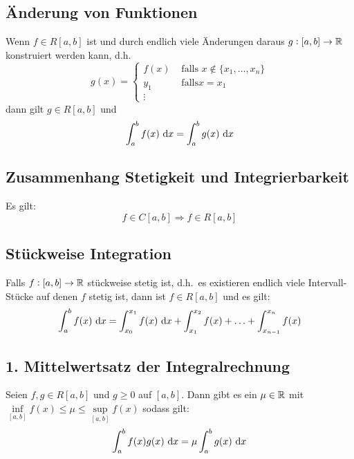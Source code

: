 \subsection{Änderung von Funktionen}
Wenn $f \in R[a, b]$ ist und durch endlich viele Änderungen daraus
$g: [a,b] \rightarrow \mathbb{R}$ konstruiert werden kann, d.h.
\begin{equation*}
    g(x) =
    \begin{cases}
        f(x) &\text{ falls } x \notin \{x_1, \ldots, x_n \} \\
        y_1 &\text{ falls} x=x_1\\
        \vdots
    \end{cases}
\end{equation*}
dann gilt $g \in R[a, b]$ und
\begin{equation*}
    \int_a^b f(x) \text{ d}x = \int_a^b g(x) \text{ d}x
\end{equation*}

\subsection{Zusammenhang Stetigkeit und Integrierbarkeit}
Es gilt:
\begin{equation*}
    f \in C[a, b] \Rightarrow f \in R[a, b]
\end{equation*}

\subsection{Stückweise Integration}
Falls $f: [a, b] \rightarrow \mathbb{R}$ stückweise stetig ist, d.h.\ es existieren
endlich viele Intervall-Stücke auf denen $f$ stetig ist, dann ist
$f \in R[a,b]$ und es gilt:
\begin{equation*}
    \int_a^b f(x) \text{ d}x = \int_{x_0}^{x_1} f(x) \text{ d}x + \int_{x_1}^{x_2} f(x)
    + \ldots + \int_{x_{n-1}}^{x_n} f(x)
\end{equation*}

\subsection{1. Mittelwertsatz der Integralrechnung}
Seien $f, g \in R[a,b]$ und $g \geq 0$ auf $[a, b]$. Dann gibt es ein $\mu \in \mathbb{R}$
mit $\inf\limits_{[a,b]} f(x) \leq \mu \leq \sup\limits_{[a,b]} f(x)$ sodass gilt:
\begin{equation*}
    \int_a^b f(x)g(x)\text{ d}x = \mu \int_a^b g(x) \text{ d}x
\end{equation*}

